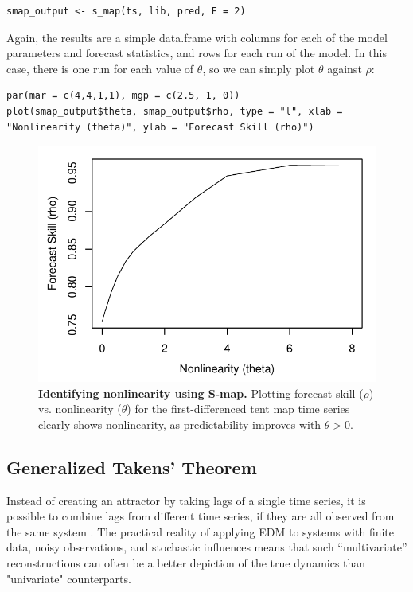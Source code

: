 \begin{lstlisting}
smap_output <- s_map(ts, lib, pred, E = 2)
\end{lstlisting}

Again, the results are a simple data.frame with columns for each of the model parameters and forecast statistics, and rows for each run of the model. In this case, there is one run for each value of $\theta$, so we can simply plot $\theta$ against $\rho$:

\begin{lstlisting}
par(mar = c(4,4,1,1), mgp = c(2.5, 1, 0))
plot(smap_output$theta, smap_output$rho, type = "l", xlab = "Nonlinearity (theta)", ylab = "Forecast Skill (rho)")
\end{lstlisting}

\begin{figure}[!ht]
\begin{center}\includegraphics[width=\maxwidth{\textwidth}]{fig_redm_5.pdf}\end{center}
\caption[Identifying nonlinearity using S-map.]{\textbf{Identifying nonlinearity using S-map.}\newline
Plotting forecast skill ($\rho$) vs. nonlinearity ($\theta$) for the first-differenced tent map time series clearly shows nonlinearity, as predictability improves with $\theta > 0$.}
\end{figure}

\subsection{Generalized Takens' Theorem}

Instead of creating an attractor by taking lags of a single time series, it is possible to combine lags from different time series, if they are all observed from the same system \cite{Sauer_1991, Deyle_2011}. The practical reality of applying EDM to systems with finite data, noisy observations, and stochastic influences means that such ``multivariate'' reconstructions can often be a better depiction of the true dynamics than "univariate" counterparts.

